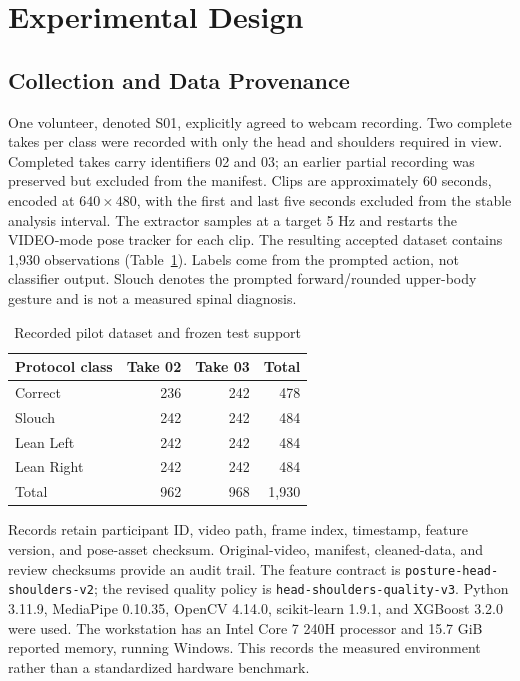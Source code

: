 \documentclass[conference]{IEEEtran}
\newcommand{\smalltable}{\setlength{\tabcolsep}{3.5pt}\renewcommand{\arraystretch}{1.12}\footnotesize}
\begin{document}
\section{Experimental Design}
\subsection{Collection and Data Provenance}
One volunteer, denoted S01, explicitly agreed to webcam recording. Two complete takes per class were recorded with only the head and shoulders required in view. Completed takes carry identifiers 02 and 03; an earlier partial recording was preserved but excluded from the manifest. Clips are approximately 60 seconds, encoded at $640\times480$, with the first and last five seconds excluded from the stable analysis interval. The extractor samples at a target 5 Hz and restarts the VIDEO-mode pose tracker for each clip. The resulting accepted dataset contains 1,930 observations (Table~\ref{tab:counts}). Labels come from the prompted action, not classifier output. Slouch denotes the prompted forward/rounded upper-body gesture and is not a measured spinal diagnosis.

\begin{table}[t]\caption{Recorded pilot dataset and frozen test support}\label{tab:counts}\centering\smalltable
\begin{tabular}{lrrr}\toprule Protocol class & Take 02 & Take 03 & Total\\\midrule
Correct & 236 & 242 & 478\\
Slouch & 242 & 242 & 484\\
Lean Left & 242 & 242 & 484\\
Lean Right & 242 & 242 & 484\\\midrule
Total & 962 & 968 & 1,930\\\bottomrule
\end{tabular}\end{table}

Records retain participant ID, video path, frame index, timestamp, feature version, and pose-asset checksum. Original-video, manifest, cleaned-data, and review checksums provide an audit trail. The feature contract is \texttt{posture-head-shoulders-v2}; the revised quality policy is \texttt{head-shoulders-quality-v3}. Python 3.11.9, MediaPipe 0.10.35, OpenCV 4.14.0, scikit-learn 1.9.1, and XGBoost 3.2.0 were used. The workstation has an Intel Core 7 240H processor and 15.7 GiB reported memory, running Windows. This records the measured environment rather than a standardized hardware benchmark.
\end{document}
